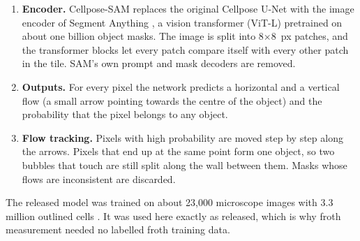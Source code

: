 \begin{enumerate}
\tightlist
\item \textbf{Encoder.} Cellpose-SAM \citep{pachitariu2025} replaces the
original Cellpose U-Net with the image encoder of Segment Anything
\citep[SAM,][]{kirillov2023}, a vision transformer (ViT-L) pretrained on
about one billion object masks. The image is split into 8$\times$8~px
patches, and the transformer blocks let every patch compare itself with
every other patch in the tile. SAM's own prompt and mask decoders are
removed.
\item \textbf{Outputs.} For every pixel the network predicts a horizontal
and a vertical flow (a small arrow pointing towards the centre of the
object) and the probability that the pixel belongs to any object.
\item \textbf{Flow tracking.} Pixels with high probability are moved step
by step along the arrows. Pixels that end up at the same point form one
object, so two bubbles that touch are still split along the wall between
them. Masks whose flows are inconsistent are discarded.
\end{enumerate}

The released model was trained on about 23,000 microscope images with 3.3
million outlined cells \citep{pachitariu2025}. It was used here exactly as
released, which is why froth measurement needed no labelled froth training
data.

